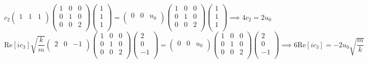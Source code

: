 \documentclass[a4paper]{article}
\begin{document}
\begin{ans}
$$c_2\begin{pmatrix}1&1&1\\\end{pmatrix}\begin{pmatrix}1&0&0\\0&1&0\\0&0&2\\\end{pmatrix}\begin{pmatrix}1\\1\\1\\\end{pmatrix}=\begin{pmatrix}0&0&u_0\\\end{pmatrix}\begin{pmatrix}1&0&0\\0&1&0\\0&0&2\\\end{pmatrix}\begin{pmatrix}1\\1\\1\\\end{pmatrix}\implies 4c_2=2u_0$$
$$\text{Re}[ic_3]\sqrt{\frac{k}{m}}\begin{pmatrix}2&0&-1\\\end{pmatrix}\begin{pmatrix}1&0&0\\0&1&0\\0&0&2\\\end{pmatrix}\begin{pmatrix}2\\0\\-1\\\end{pmatrix}=\begin{pmatrix}0&0&u_0\\\end{pmatrix}\begin{pmatrix}1&0&0\\0&1&0\\0&0&2\\\end{pmatrix}\begin{pmatrix}2\\0\\-1\\\end{pmatrix}\implies 6\text{Re}[ic_3]=-2u_0\sqrt{\frac{m}{k}}$$

\end{ans}
\end{document}
